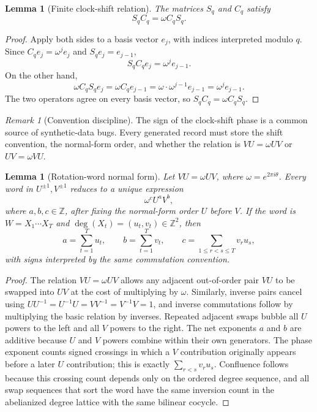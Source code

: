 \documentclass[11pt]{article}
\theoremstyle{definition}
\theoremstyle{plain}
\newtheorem{lemma}[definition]{Lemma}
\theoremstyle{remark}
\newtheorem{remark}[definition]{Remark}
\numberwithin{equation}{section}
\newcommand{\Z}{\mathbb{Z}}
\begin{document}
\begin{lemma}[Finite clock-shift relation]
The matrices $S_q$ and $C_q$ satisfy
\begin{equation}
  S_qC_q=\omega C_qS_q.
\end{equation}
\end{lemma}

\begin{proof}
Apply both sides to a basis vector $e_j$, with indices interpreted modulo $q$.  Since $C_qe_j=\omega^j e_j$ and $S_qe_j=e_{j-1}$,
\begin{equation}
  S_qC_qe_j=\omega^j e_{j-1}.
\end{equation}
On the other hand,
\begin{equation}
  \omega C_qS_qe_j=\omega C_qe_{j-1}=\omega\cdot\omega^{j-1}e_{j-1}=\omega^j e_{j-1}.
\end{equation}
The two operators agree on every basis vector, so $S_qC_q=\omega C_qS_q$.
\end{proof}

\begin{remark}[Convention discipline]
The sign of the clock-shift phase is a common source of synthetic-data bugs.  Every generated record must store the shift convention, the normal-form order, and whether the relation is $VU=\omega UV$ or $UV=\omega VU$.
\end{remark}

\begin{lemma}[Rotation-word normal form]
Let $VU=\omega UV$, where $\omega=e^{2\pi i\theta}$.  Every word in $U^{\pm1},V^{\pm1}$ reduces to a unique expression
\begin{equation}
  \omega^c U^aV^b,
\end{equation}
where $a,b,c\in\Z$, after fixing the normal-form order $U$ before $V$.  If the word is $W=X_1\cdots X_T$ and $\deg(X_t)=(u_t,v_t)\in\Z^2$, then
\begin{equation}
  a=\sum_{t=1}^T u_t,
  \qquad b=\sum_{t=1}^T v_t,
  \qquad c=\sum_{1\le r<s\le T} v_r u_s,
\end{equation}
with signs interpreted by the same commutation convention.
\end{lemma}

\begin{proof}
The relation $VU=\omega UV$ allows any adjacent out-of-order pair $VU$ to be swapped into $UV$ at the cost of multiplying by $\omega$.  Similarly, inverse pairs cancel using $UU^{-1}=U^{-1}U=VV^{-1}=V^{-1}V=1$, and inverse commutations follow by multiplying the basic relation by inverses.  Repeated adjacent swaps bubble all $U$ powers to the left and all $V$ powers to the right.  The net exponents $a$ and $b$ are additive because $U$ and $V$ powers combine within their own generators.  The phase exponent counts signed crossings in which a $V$ contribution originally appears before a later $U$ contribution; this is exactly $\sum_{r<s}v_ru_s$.  Confluence follows because this crossing count depends only on the ordered degree sequence, and all swap sequences that sort the word have the same inversion count in the abelianized degree lattice with the same bilinear cocycle.
\end{proof}
\end{document}

